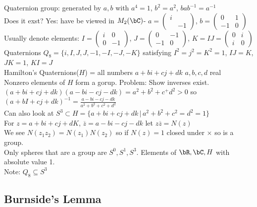 \noindent
Quaternion group: generated by $a,b$ with $a^4=1$, $b^2=a^2$, $bab^{-1}=a^{-1}$ \\
Does it exst? \quad Yes: have be viewed in $M_2(\bC)$- $a = \begin{pmatrix}i & \\ & -1\end{pmatrix}$, $b = \begin{pmatrix}0 & 1 \\ -1 & 0\end{pmatrix}$ \\
Usually denote elements: $I = \begin{pmatrix}i & 0 \\ 0 & -1\end{pmatrix}$, $J = \begin{pmatrix}0 & -1 \\ -1 & 0\end{pmatrix}$, $K = IJ= \begin{pmatrix}0 & i\\ i& 0\end{pmatrix}$ \\
Quaternions $Q_8 = \{i, I, J, J, -1, -I, -J, -K\}$ satisfying $ I^2=j^2=K^2 =1$, $IJ = K$, $JK=1$, $KI=J$ \\
Hamilton's Quaternions($H$) = all numbers $a + bi + cj + dk$ $a,b,c,d$ real \\
Nonzero elements of $H$ form a gorup. \quad Problem: Show inverses exist. \\
$(a+bi+cj+dk)(a-bi-cj-dk) = a^2 + b^2 + c^ + d^2 >0 $ so \\
$(a+bI+cj+dk)^{-1} = \frac{a-bi-cj-dk}{a^2+b^2+c^2+d^2}$ \\
Can also look at $S^3 \subset H = \{a + bi +cj+dk \, | \, a^2+b^2+c^2=d^2=1\}$ \\
For $z = a+bi+cj+dK$, $\overline{z}=a-bi-cj-dk$ let $z\overline{z} = N(z)$ \\
We see $N(z_1z_2)=N(z_1)N(z_2)$ so if $N(z)=1$ closed under $\times$ so is a group. \\

\noindent
Only spheres that are a group are $S^0, S^1, S^3$. Elements of $\bR, \bC, H$ with absolute value 1. \\

\noindent
Note: $Q_8 \subseteq S^3$ 

\subsection{Burnside's Lemma} 

